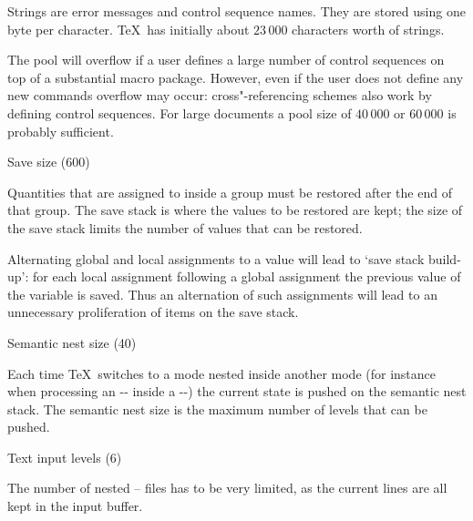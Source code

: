 Strings are error messages and control sequence names.
They are stored using one byte per character.
\TeX\ has initially about $23\,000$ characters worth of
strings.

The pool will overflow if a user defines a large number of
control sequences on top of a substantial macro package.
However, even if the user does not define any new commands
overflow may occur: cross"-referencing schemes also
work by defining control sequences. For large documents
a pool size of $40\,000$ or $60\,000$ is probably sufficient.

\spoint Save size {\rm(600)}

Quantities that are assigned to inside a group must be
restored after the end of that group.
The save stack is where the values to be restored are kept;
the size of the
save stack limits the number of values that can be restored.

Alternating global and local assignments to a value
will lead to `save stack build-up': for each local
assignment following a global assignment the
previous value of the variable is saved. Thus an
alternation of such assignments will lead to
an unnecessary proliferation of items on the save stack.

\spoint Semantic nest size {\rm(40)}

Each time \TeX\ switches to a mode nested inside another
mode (for instance when processing an \ver-\hbox- inside
a \ver-\vbox-) the current state is pushed on the
semantic nest stack. The semantic nest size is the maximum
number of levels that can be pushed.

\spoint Text input levels {\rm(6)}

The number of nested \ver-- files 
has to be very limited,
as the current lines are all kept in the input buffer.

\endinput










